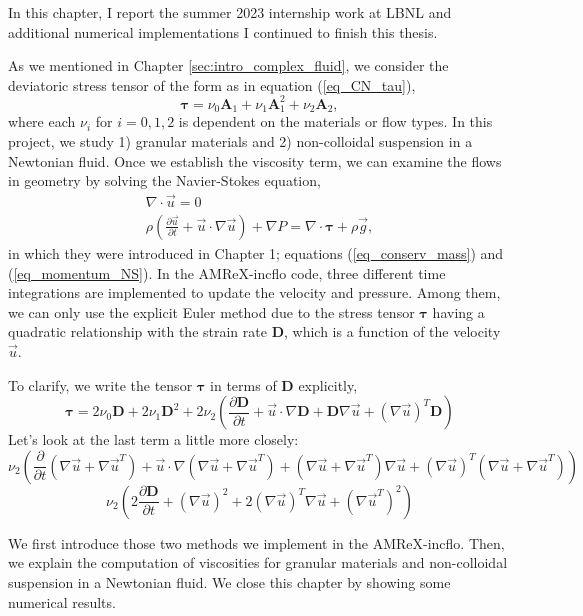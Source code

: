 \par
In this chapter, I report the summer 2023 internship work at LBNL and additional numerical implementations I continued to finish this thesis.

As we mentioned in Chapter \ref{sec:intro_complex_fluid}, we consider the deviatoric stress tensor of the form as in equation (\ref{eq_CN_tau}), 
\begin{equation}
  \boldsymbol{\tau} =
  \nu_0  \bm{A}_1 +  \nu_1  \bm{A}_1^2 + \nu_2 \bm{A}_2 ,
\nonumber
\end{equation}
where each $\nu_i$ for $i = 0,1,2$ is dependent on the materials or flow types. In this project, we study 1) granular materials and 2) non-colloidal suspension in a Newtonian fluid. 
Once we establish the viscosity term, we can examine the flows in geometry by solving the Navier-Stokes equation,
\begin{align}
  \nabla \cdot \vec{u} = 0 
  \nonumber \\
  \rho 
  \left( 
     \frac{\partial \vec{u}}{\partial t} + \vec{u}\cdot \nabla \vec{u}
  \right)
  + \nabla P 
    = \nabla \cdot   \bm{\tau} 
    +  \rho  \vec{g} ,
  \nonumber
  \end{align}
in which they were introduced in Chapter 1; equations (\ref{eq_conserv_mass}) and (\ref{eq_momentum_NS}).
In the AMReX-incflo code, three different time integrations are implemented to update the velocity and pressure. Among them, we can only use the explicit Euler method due to the stress tensor $\bm{\tau}$ having a quadratic relationship with the strain rate $\bm{D}$, which is a function of the velocity $\vec{u}$. 
\par
To clarify, we write the tensor $\bm{\tau}$ in terms of $\bm{D}$ explicitly,
\begin{equation}
  \boldsymbol{\tau} =
  2 \nu_0  \bm{D} +  2 \nu_1  \bm{D}^2 
  + 2\nu_2 \left(
    \frac{\partial \bm{D}}{\partial t} + 
     \vec{u} \cdot \nabla \bm{D}
    +\bm{D} \nabla \vec{u}+ \left(\nabla \vec{u} \right)^T \bm{D} 
   \right)
\end{equation}
Let's look at the last term a little more closely:
\begin{equation}
  \nu_2 \left(
   \frac{\partial }{\partial t}\left( \nabla \vec{u} +  \nabla\vec{u}^T \right) + 
    \vec{u} \cdot \nabla \left(  \nabla\vec{u} +  \nabla\vec{u}^T \right) 
   +\left(  \nabla\vec{u} + \nabla \vec{u}^T \right)  \nabla \vec{u}+ \left(\nabla \vec{u} \right)^T \left(  \nabla\vec{u} +  \nabla\vec{u}^T \right) 
  \right)
\end{equation}
\begin{equation}
  \nu_2 \left(
   2\frac{\partial \bm{D} }{\partial t}
   + \left(\nabla\vec{u}  \right)^2
  + 2(\nabla \vec{u})^T  \nabla \vec{u}+
   \left(    \nabla\vec{u}^T \right)^2
  \right)
\end{equation}
\par
We first introduce those two methods we implement in the AMReX-incflo. Then, we explain the computation of viscosities for granular materials and non-colloidal suspension in a Newtonian fluid. We close this chapter by showing some numerical results.
